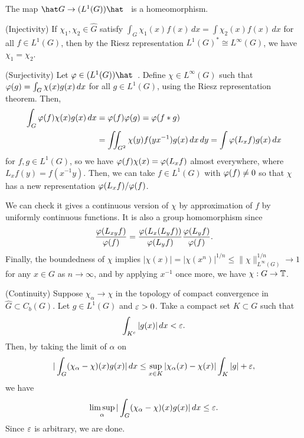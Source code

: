\documentclass[a4paper]{article}
\begin{document}
\begin{prop}
The map $\hat G\to(L^1(G))\hat\enspace$ is a homeomorphism.
\end{prop}
\begin{pf}
(Injectivity)
If $\chi_1,\chi_2\in\hat G$ satisfy $\int_G\chi_1(x)f(x)\,dx=\int\chi_2(x)f(x)\,dx$ for all $f\in L^1(G)$, then by the Riesz representation $L^1(G)^*\cong L^\infty(G)$, we have $\chi_1=\chi_2$.


(Surjectivity)
Let $\f\in(L^1(G))\hat\enspace$.
Define $\chi\in L^\infty(G)$ such that $\varphi(g)=\int_G\chi(x)g(x)\,dx$ for all $g\in L^1(G)$, using the Riesz representation theorem.
Then,
\begin{align*}
\int_G\varphi(f)\chi(x)g(x)\,dx&=\varphi(f)\varphi(g)=\varphi(f*g)\\
&=\iint_{G^2}\chi(y)f(yx^{-1})g(x)\,dx\,dy=\int\varphi(L_xf)g(x)\,dx
\end{align*}
for $f,g\in L^1(G)$, so we have $\varphi(f)\chi(x)=\varphi(L_xf)$ almost everywhere, where $L_xf(y)=f(x^{-1}y)$.
Then, we can take $f\in L^1(G)$ with $\varphi(f)\ne0$ so that $\chi$ has a new representation $\varphi(L_xf)/\varphi(f)$.

We can check it gives a continuous version of $\chi$ by approximation of $f$ by uniformly continuous functions.
It is also a group homomorphism since
\[\frac{\varphi(L_{xy}f)}{\varphi(f)}=\frac{\varphi(L_x(L_yf))}{\varphi(L_yf)}\frac{\varphi(L_yf)}{\varphi(f)}.\]
Finally, the boundedness of $\chi$ implies $|\chi(x)|=|\chi(x^n)|^{1/n}\le\|\chi\|_{L^\infty(G)}^{1/n}\to1$ for any $x\in G$ as $n\to\infty$, and by applying $x^{-1}$ once more, we have $\chi:G\to\mathbb{T}$.

(Continuity)
Suppose $\chi_\alpha\to\chi$ in the topology of compact convergence in $\hat G\subset C_b(G)$.
Let $g\in L^1(G)$ and $\varepsilon>0$.
Take a compact set $K\subset G$ such that
\[\int_{K^c}|g(x)|\,dx<\varepsilon.\]
Then, by taking the limit of $\alpha$ on
\[|\int_G(\chi_\alpha-\chi)(x)g(x)|\,dx\le\sup_{x\in K}|\chi_\alpha(x)-\chi(x)|\int_K|g|+\varepsilon,\]
we have
\[\limsup_\alpha|\int_G(\chi_\alpha-\chi)(x)g(x)|\,dx\le\varepsilon.\]
Since $\varepsilon$ is arbitrary, we are done.


\end{pf}
\end{document}
